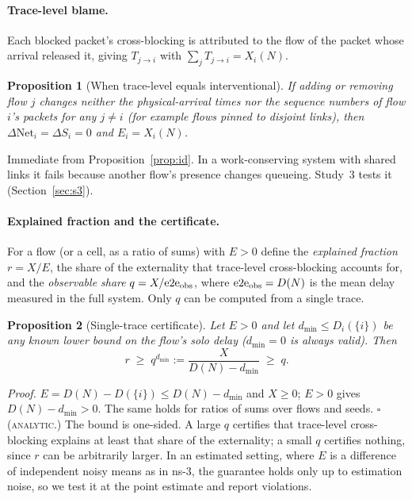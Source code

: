 \documentclass[11pt]{article}
\newcommand{\tagA}{\textsc{analytic}}
\newtheorem{proposition}{Proposition}
\begin{document}
\paragraph{Trace-level blame.} Each blocked packet's cross-blocking is attributed to the flow of the packet whose arrival released it, giving $T_{j\to i}$ with $\sum_jT_{j\to i}=X_i(N)$.
\begin{proposition}[When trace-level equals interventional]\label{prop:cond}
If adding or removing flow $j$ changes neither the physical-arrival times nor the sequence numbers of flow $i$'s packets for any $j\neq i$ (for example flows pinned to disjoint links), then $\Delta\mathrm{Net}_i=\Delta S_i=0$ and $E_i=X_i(N)$.
\end{proposition}
Immediate from Proposition~\ref{prop:id}. In a work-conserving system with shared links it fails because another flow's presence changes queueing. Study~3 tests it (Section~\ref{sec:s3}).

\paragraph{Explained fraction and the certificate.} For a flow (or a cell, as a ratio of sums) with $E>0$ define the \emph{explained fraction} $r=X/E$, the share of the externality that trace-level cross-blocking accounts for, and the \emph{observable share} $q=X/\mathrm{e2e}_{\rm obs}$, where $\mathrm{e2e}_{\rm obs}=D(N)$ is the mean delay measured in the full system. Only $q$ can be computed from a single trace.
\begin{proposition}[Single-trace certificate]\label{prop:cert}
Let $E>0$ and let $d_{\min}\le D_i(\{i\})$ be any known lower bound on the flow's solo delay ($d_{\min}=0$ is always valid). Then
\[
r\;\ge\;q^{d_{\min}}:=\frac{X}{D(N)-d_{\min}}\;\ge\;q .
\]
\end{proposition}
\emph{Proof.} $E=D(N)-D(\{i\})\le D(N)-d_{\min}$ and $X\ge0$; $E>0$ gives $D(N)-d_{\min}>0$. The same holds for ratios of sums over flows and seeds. \hfill$\square$ (\tagA{}.)
The bound is one-sided. A large $q$ certifies that trace-level cross-blocking explains at least that share of the externality; a small $q$ certifies nothing, since $r$ can be arbitrarily larger. In an estimated setting, where $E$ is a difference of independent noisy means as in ns-3, the guarantee holds only up to estimation noise, so we test it at the point estimate and report violations.
\end{document}
